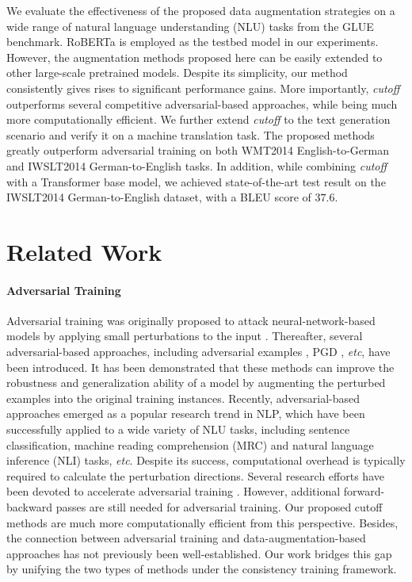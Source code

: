 \documentclass[11pt,a4paper]{article}
\begin{document}
We evaluate the effectiveness of the proposed data augmentation strategies on a wide range of natural language understanding (NLU) tasks from the GLUE benchmark. RoBERTa \cite{liu2019roberta} is employed as the testbed model in our experiments. However, the augmentation methods proposed here can be easily extended to other large-scale pretrained models. 
Despite its simplicity, our method consistently gives rises to significant performance gains.
More importantly, \emph{cutoff} outperforms several competitive adversarial-based approaches, while being much more computationally efficient. We further extend \emph{cutoff} to the text generation scenario and verify it on a machine translation task. The proposed methods greatly outperform adversarial training on both WMT2014 English-to-German and IWSLT2014 German-to-English tasks. In addition, while combining \emph{cutoff} with a Transformer base model, we achieved state-of-the-art test result on the IWSLT2014 German-to-English dataset, with a BLEU score of $37.6$.
\vspace{-0.5mm}
\section{Related Work}
\vspace{-1mm}
\paragraph{Adversarial Training}
Adversarial training was originally proposed to attack neural-network-based models by applying small perturbations to the input \cite{szegedy2013intriguing}.
Thereafter, several adversarial-based approaches, including adversarial examples \cite{goodfellow2014explaining}, PGD \cite{aleks2017deep}, \emph{etc}, have been introduced. It has been demonstrated that these methods can improve the robustness and generalization ability of a model by augmenting the perturbed examples into the original training instances. Recently, adversarial-based approaches emerged as a popular research trend in NLP, which have been successfully applied to a wide variety of NLU tasks, including sentence classification, machine reading comprehension (MRC) and natural language inference (NLI) tasks, \emph{etc}. Despite its success, computational overhead is typically required to calculate the perturbation directions. Several research efforts have been devoted to accelerate adversarial training \cite{shafahi2019adversarial, zhang2019you}. 
However, additional forward-backward passes are still needed for adversarial training. Our proposed cutoff methods are much more computationally efficient from this perspective. 
Besides, the connection  between adversarial training and data-augmentation-based approaches has not previously been well-established. 
Our work bridges this gap by unifying the two types of methods under the consistency training framework. 
\end{document}
